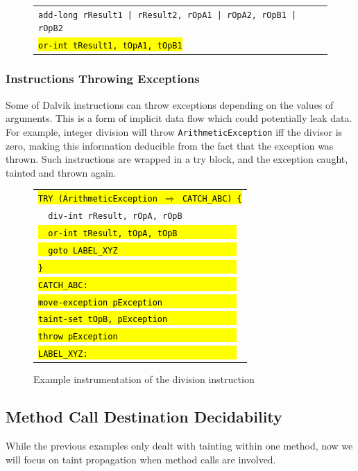 \documentclass[12pt,twoside,notitlepage]{report}
\newcommand{\centerbox}[1] {
	\begin{center}
	\begin{footnotesize}
	\begin{tabular}{l}
		#1
	\end{tabular}
	\end{footnotesize}
	\end{center}
}
\newcommand{\asm}[1] {\texttt{#1}}
\newcommand{\asmExtra}[1] {\texttt{\hl{#1}}}
\begin{document}
	\begin{figure}[H]
		\centerbox{
			\asm{add-long rResult1 | rResult2, rOpA1 | rOpA2, rOpB1 | rOpB2} \\
			\asmExtra{or-int tResult1, tOpA1, tOpB1}
		}
	\end{figure}

\subsubsection{Instructions Throwing Exceptions}

Some of Dalvik instructions can throw exceptions depending on the values of arguments. This is a form of implicit data flow which could potentially leak data. For example, integer division will throw \verb$ArithmeticException$ iff the divisor is zero, making this information deducible from the fact that the exception was thrown. Such instructions are wrapped in a try block, and the exception caught, tainted and thrown again.

	\begin{figure}[H]
		\centerbox{
			\asmExtra{TRY (ArithmeticException $\Rightarrow$ CATCH\_ABC) \{} \\
			\asm{~~div-int rResult, rOpA, rOpB} \\
			\asmExtra{~~or-int tResult, tOpA, tOpB~~~~~~~~~~~~} \\
			\asmExtra{~~goto LABEL\_XYZ~~~~~~~~~~~~~~~~~~~~~~~~} \\
			\asmExtra{\}~~~~~~~~~~~~~~~~~~~~~~~~~~~~~~~~~~~~~~~} \\
			\asmExtra{CATCH\_ABC:~~~~~~~~~~~~~~~~~~~~~~~~~~~~~~} \\
			\asmExtra{move-exception pException~~~~~~~~~~~~~~~} \\
			\asmExtra{taint-set tOpB, pException~~~~~~~~~~~~~~} \\
			\asmExtra{throw pException~~~~~~~~~~~~~~~~~~~~~~~~} \\	
			\asmExtra{LABEL\_XYZ:~~~~~~~~~~~~~~~~~~~~~~~~~~~~~~}
		}
		\caption{Example instrumentation of the division instruction}
		\label{figure:TaintPropagation_ThrowingInstructions}
	\end{figure}

\subsection{Method Call Destination Decidability}
\label{section:TaintPropagation_DestDecision}

While the previous examples only dealt with tainting within one method, now we will focus on taint propagation when method calls are involved. 
\end{document}
